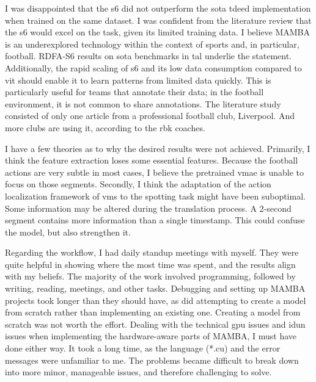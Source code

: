 I was disappointed that the \acrfull{s6} did not outperform the \acrshort{sota} \acrshort{tdeed} implementation when trained on the same dataset. I was confident from the literature review that the \acrshort{s6} would excel on the task, given its limited training data. I believe MAMBA is an underexplored technology within the context of sports\cite{survey_of_survey} and, in particular, football\cite{seweryn_survey_2023}. RDFA-S6\cite{lee_enhancing_mamba_s6_2024} results on \acrshort{sota} benchmarks in \acrshort{tal} underlie the statement. Additionally, the rapid scaling of \acrshort{s6} and its low data consumption compared to \acrfull{vit} should enable it to learn patterns from limited data quickly. This is particularly useful for teams that annotate their data; in the football environment, it is not common to share annotations. The literature study consisted of only one article from a professional football club, Liverpool. And more clubs are using it, according to the \acrshort{rbk} coaches. 

I have a few theories as to why the desired results were not achieved. Primarily, I think the feature extraction loses some essential features. Because the football actions are very subtle in most cases, I believe the pretrained \acrshort{vmae} is unable to focus on those segments. Secondly, I think the adaptation of the action localization framework of \acrshort{vms} to the spotting task might have been suboptimal. Some information may be altered during the translation process. A 2-second segment contains more information than a single timestamp. This could confuse the model, but also strengthen it. 

Regarding the workflow, I had daily standup meetings with myself. They were quite helpful in showing where the most time was spent, and the results align with my beliefs. The majority of the work involved programming, followed by writing, reading, meetings, and other tasks. Debugging and setting up MAMBA projects took longer than they should have, as did attempting to create a model from scratch rather than implementing an existing one. Creating a model from scratch was not worth the effort. Dealing with the technical \acrshort{gpu} issues and \acrshort{idun} issues when implementing the hardware-aware parts of MAMBA, I must have done either way. It took a long time, as the language (*.cu) and the error messages were unfamiliar to me. The problems became difficult to break down into more minor, manageable issues, and therefore challenging to solve. 

